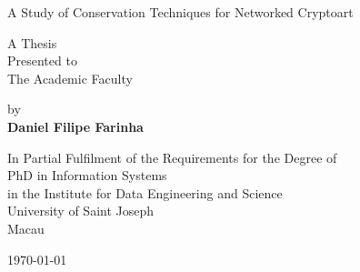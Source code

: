 

\begin{titlepage}
    \begin{center}
        \vspace*{1cm}
        
        
        
        \vspace{3.5cm}
        

        \LARGE
        A Study of Conservation Techniques for Networked Cryptoart
        
        \vspace{2cm}

        \normalsize
        A Thesis\\
        Presented to\\
        The Academic Faculty
        
        \vspace{1cm}
        
        by\\
        \textbf{Daniel Filipe Farinha}
        
     
        \vfill
       
        
 
 	\vspace{0.5cm}

        \normalsize
        In Partial Fulfilment of the Requirements for the Degree of \\
        PhD in Information Systems\\
        in the Institute for Data Engineering and Science\\
        University of Saint Joseph\\
        Macau\\
        
        \vspace{1cm}

	\monthyeardate\today
	        
    \end{center}
\end{titlepage}